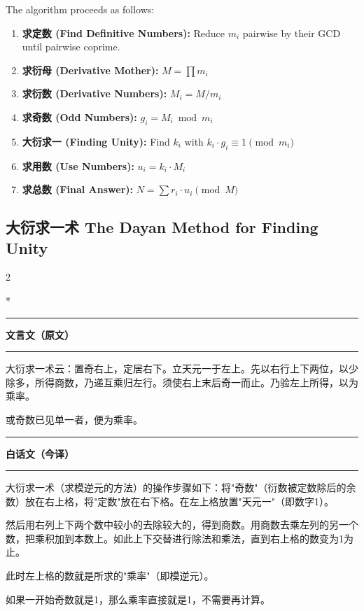 \documentclass[11pt,a4paper]{article}
\newcommand{\zhtext}[1]{{\chinese #1}}
\newcommand{\leftcolheader}{%
  \noindent\textcolor{leftheader}{\rule{\columnwidth}{1.5pt}}\par
  \vspace{2pt}
  \noindent\textbf{\color{leftheader}\chinese 文言文（原文）}\par
  \vspace{2pt}
  \noindent\textcolor{leftheader}{\rule{\columnwidth}{0.6pt}}\par
  \vspace{4pt}
}
\newcommand{\rightcolheader}{%
  \noindent\textcolor{rightheader}{\rule{\columnwidth}{1.5pt}}\par
  \vspace{2pt}
  \noindent\textbf{\color{rightheader}\chinese 白话文（今译）}\par
  \vspace{2pt}
  \noindent\textcolor{rightheader}{\rule{\columnwidth}{0.6pt}}\par
  \vspace{4pt}
}
\begin{document}
The algorithm proceeds as follows:
\begin{enumerate}[label=Step \arabic*.]
  \item \textbf{\zhtext{求定数} (Find Definitive Numbers):} Reduce $m_i$ pairwise by their GCD until pairwise coprime.
  \item \textbf{\zhtext{求衍母} (Derivative Mother):} $M = \prod m_i$
  \item \textbf{\zhtext{求衍数} (Derivative Numbers):} $M_i = M / m_i$
  \item \textbf{\zhtext{求奇数} (Odd Numbers):} $g_i = M_i \bmod m_i$
  \item \textbf{\zhtext{大衍求一} (Finding Unity):} Find $k_i$ with $k_i \cdot g_i \equiv 1 \pmod{m_i}$
  \item \textbf{\zhtext{求用数} (Use Numbers):} $u_i = k_i \cdot M_i$
  \item \textbf{\zhtext{求总数} (Final Answer):} $N = \sum r_i \cdot u_i \pmod{M}$
\end{enumerate}

\subsection{\zhtext{大衍求一术} The Dayan Method for Finding Unity}

\begin{paracol}{2}

\switchcolumn[0]*\leftcolheader

\small
\begin{classicalbox}
大衍求一术云：置奇右上，定居右下。立天元一于左上。先以右行上下两位，以少除多，所得商数，乃递互乘归左行。须使右上末后奇一而止。乃验左上所得，以为乘率。

或奇数已见单一者，便为乘率。
\end{classicalbox}

\switchcolumn\rightcolheader

\small
\begin{modernbox}
大衍求一术（求模逆元的方法）的操作步骤如下：将"奇数"（衍数被定数除后的余数）放在右上格，将"定数"放在右下格。在左上格放置"天元一"（即数字1）。

然后用右列上下两个数中较小的去除较大的，得到商数。用商数去乘左列的另一个数，把乘积加到本数上。如此上下交替进行除法和乘法，直到右上格的数变为1为止。

此时左上格的数就是所求的"乘率"（即模逆元）。

如果一开始奇数就是1，那么乘率直接就是1，不需要再计算。
\end{modernbox}

\end{paracol}
\end{document}
